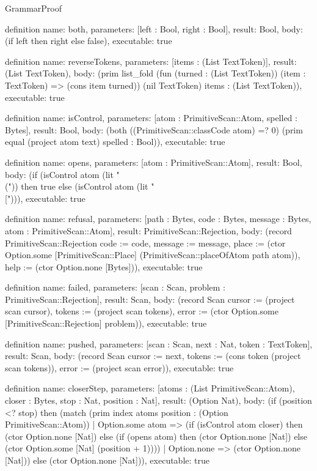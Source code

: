 \begin{lexlean}{GrammarProof}
\begin{semanticmodule}
definition{
  name: both,
  parameters: [left : Bool, right : Bool],
  result: Bool,
  body: (if left then right else false),
  executable: true
}

definition{
  name: reverseTokens,
  parameters: [items : (List TextToken)],
  result: (List TextToken),
  body: (prim list_fold (fun (turned : (List TextToken)) (item : TextToken) => (cons item turned)) (nil TextToken) items : (List TextToken)),
  executable: true
}

definition{
  name: isControl,
  parameters: [atom : PrimitiveScan::Atom, spelled : Bytes],
  result: Bool,
  body: (both ((PrimitiveScan::classCode atom) =? 0) (prim equal (project atom text) spelled : Bool)),
  executable: true
}

definition{
  name: opens,
  parameters: [atom : PrimitiveScan::Atom],
  result: Bool,
  body: (if (isControl atom (lit "\\(")) then true else (isControl atom (lit "\\["))),
  executable: true
}

definition{
  name: refusal,
  parameters: [path : Bytes, code : Bytes, message : Bytes, atom : PrimitiveScan::Atom],
  result: PrimitiveScan::Rejection,
  body: (record PrimitiveScan::Rejection {code := code, message := message, place := (ctor Option.some [PrimitiveScan::Place] (PrimitiveScan::placeOfAtom path atom)), help := (ctor Option.none [Bytes])}),
  executable: true
}

definition{
  name: failed,
  parameters: [scan : Scan, problem : PrimitiveScan::Rejection],
  result: Scan,
  body: (record Scan {cursor := (project scan cursor), tokens := (project scan tokens), error := (ctor Option.some [PrimitiveScan::Rejection] problem)}),
  executable: true
}

definition{
  name: pushed,
  parameters: [scan : Scan, next : Nat, token : TextToken],
  result: Scan,
  body: (record Scan {cursor := next, tokens := (cons token (project scan tokens)), error := (project scan error)}),
  executable: true
}

definition{
  name: closerStep,
  parameters: [atoms : (List PrimitiveScan::Atom), closer : Bytes, stop : Nat, position : Nat],
  result: (Option Nat),
  body: (if (position <? stop) then (match (prim index atoms position : (Option PrimitiveScan::Atom))
    | Option.some atom => (if (isControl atom closer) then (ctor Option.none [Nat]) else (if (opens atom) then (ctor Option.none [Nat]) else (ctor Option.some [Nat] (position + 1))))
    | Option.none => (ctor Option.none [Nat])) else (ctor Option.none [Nat])),
  executable: true
}


\end{semanticmodule}
\end{lexlean}
